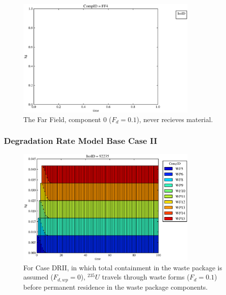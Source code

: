 \begin{frame}
\begin{figure}
\begin{minipage}[b]{0.45\linewidth}
  \includegraphics[width=0.8\textwidth]{./images/drI0.eps}
  \caption[Case DRI Far Field Contaminants.]{ 
    The Far Field, component 0 ($F_d = 0.1$), never recieves material.
    }
  \label{fig:drIff0}

  \end{minipage}
\end{figure}
\end{frame}



\begin{frame}[ctb!]
  \frametitle{Degradation Rate Model Base Case II}
\begin{figure}[ht]
\centering
\includegraphics[width=0.8\textwidth]{./images/drII.eps}
\caption[$^{235}U$ residence. Degradation Rate Waste Package No Release.]{
For Case DRII, in which total containment in the waste package is assumed ($F_{d,wp}=0$), 
$^{235}U$ travels through waste forms ($F_d = 0.1$) before 
permanent residence in the waste package components.
}
\label{fig:drIIall}
\end{figure}
\end{frame}

